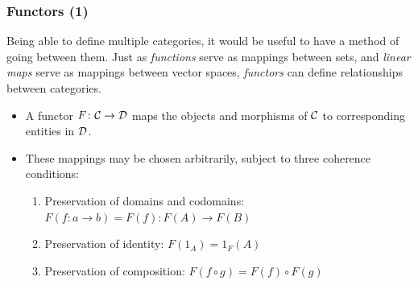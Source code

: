 \documentclass{beamer}
\numberwithin{figure}{section}
\begin{document}
\begin{frame}
        \frametitle{Functors (1)}
        Being able to define multiple categories, it would be useful to have a
        method of going between them. Just as \emph{functions} serve as mappings
        between sets, and \emph{linear maps} serve as mappings between vector
        spaces, \emph{functors} can define relationships between categories.
        \pause
        \begin{itemize}
                \item A functor $F \colon \mathcal{C} \to \mathcal{D}$ maps the
                        objects and morphisms of $\mathcal{C}$ to corresponding
                        entities in $\mathcal{D}$.
                \item These mappings may be chosen arbitrarily, subject to three
                        coherence conditions:
                        \begin{enumerate}
                                \item Preservation of domains and codomains:
                                        $F(f \colon a \to b) = F(f) \colon F(A)
                                        \to F(B)$
                                \item Preservation of identity:
                                        $F(1_A) = 1_F(A)$
                                \item Preservation of composition:
                                        $F(f \circ g) = F(f) \circ F(g)$
                        \end{enumerate}
        \end{itemize}
\end{frame}
\end{document}
